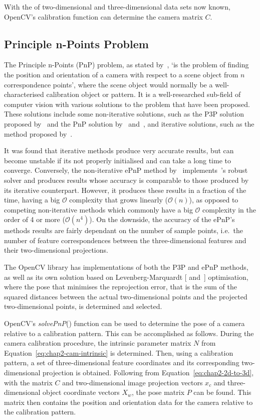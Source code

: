 With the of two-dimensional and three-dimensional data sets now known, OpenCV's calibration function can determine the camera matrix $C$. 

\subsection{Principle n-Points Problem}

The Principle n-Points (PnP) problem, as stated by~\cite{horaud1989analytic}, `is the problem of finding the position and orientation of a camera with respect to a scene object from $n$ correspondence points', where the scene object would normally be a well-characterised calibration object or pattern. It is a well-researched sub-field of computer vision with various solutions to the problem that have been proposed. These solutions include some non-iterative solutions, such as the P3P solution proposed by~\cite{gao2003complete} and the PnP solution by~\cite{lepetit2009epnp} and~\cite{schweighofer2006robust}, and iterative solutions, such as the method proposed by~\cite{lu2000fast}.

It was found that iterative methods produce very accurate results, but can become unstable if its not properly initialised and can take a long time to converge. Conversely, the non-iterative ePnP method by~\citeauthor{lepetit2009epnp} implements~\citeauthor{schweighofer2006robust}'s robust solver and produces results whose accuracy is comparable to those produced by its iterative counterpart. However, it produces these results in a fraction of the time, having a big $\mathcal{O}$ complexity that grows linearly ($\mathcal{O}(n)$), as opposed to competing non-iterative methods which commonly have a big $\mathcal{O}$ complexity in the order of 4 or more ($\mathcal{O}(n^4)$). On the downside, the accuracy of the ePnP's methods results are fairly dependant on the number of sample points, i.e.\ the number of feature correspondences between the three-dimensional features and their two-dimensional projections. 

The OpenCV library has implementations of both the P3P and ePnP methods, as well as its own solution based on Levenberg-Marquardt [\cite{levenberg1944method} and~\cite{marquardt1963algorithm}] optimisation, where the pose that minimises the reprojection error, that is the sum of the squared distances between the actual two-dimensional points and the projected two-dimensional points, is determined and selected. 

OpenCV's \emph{solvePnP}() function can be used to determine the pose of a camera relative to a calibration pattern. This can be accomplished as follows. During the camera calibration procedure, the intrinsic parameter matrix $N$ from Equation~\ref{eq:chap2-cam-intrinsic} is determined. Then, using a calibration pattern, a set of three-dimensional feature coordinates and its corresponding two-dimensional projection is obtained. Following from Equation~\ref{eq:chap2-2d-to-3d}, with the matrix $C$ and two-dimensional image projection vectors $x_c$ and three-dimensional object coordinate vectors $X_w$, the pose matrix $P$ can be found. This matrix then contains the position and orientation data for the camera relative to the calibration pattern. 

